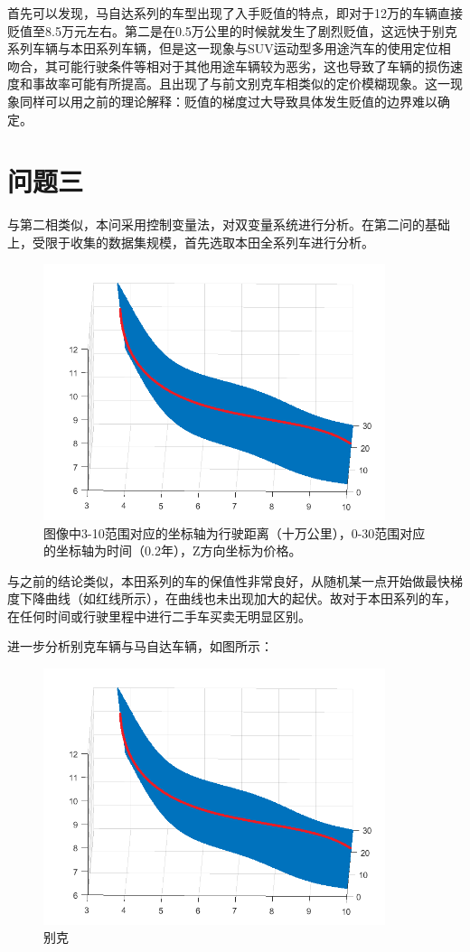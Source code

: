 \documentclass{ctexart}
\begin{document}
首先可以发现，马自达系列的车型出现了入手贬值的特点，即对于12万的车辆直接贬值至8.5万元左右。第二是在0.5万公里的时候就发生了剧烈贬值，这远快于别克系列车辆与本田系列车辆，但是这一现象与SUV运动型多用途汽车的使用定位相吻合，其可能行驶条件等相对于其他用途车辆较为恶劣，这也导致了车辆的损伤速度和事故率可能有所提高。且出现了与前文别克车相类似的定价模糊现象。这一现象同样可以用之前的理论解释：贬值的梯度过大导致具体发生贬值的边界难以确定。


\newpage
\section{问题三}%
\label{sec:问题三}
与第二相类似，本问采用控制变量法，对双变量系统进行分析。在第二问的基础上，受限于收集的数据集规模，首先选取本田全系列车进行分析。
\renewcommand\figurename{图}
\begin{figure}[H]
	\centering
	\includegraphics[width=10cm]{for.png}
	\caption{图像中3-10范围对应的坐标轴为行驶距离（十万公里），0-30范围对应的坐标轴为时间（0.2年），Z方向坐标为价格。} \label{all}
\end{figure}

与之前的结论类似，本田系列的车的保值性非常良好，从随机某一点开始做最快梯度下降曲线（如红线所示），在曲线也未出现加大的起伏。故对于本田系列的车，在任何时间或行驶里程中进行二手车买卖无明显区别。

进一步分析别克车辆与马自达车辆，如图所示：
\renewcommand\figurename{图}
\begin{figure}[H]
	\centering
	\includegraphics[width=10cm]{for.png}
	\caption{别克} \label{all}
\end{figure}
\end{document}
